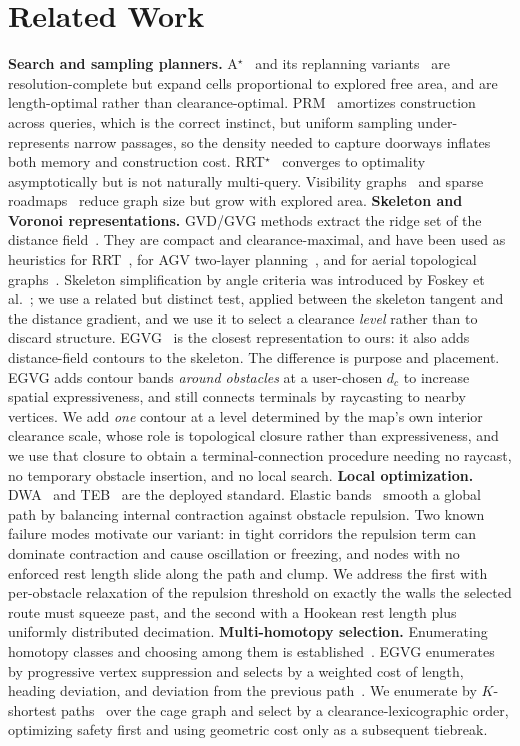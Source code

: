 \documentclass[conference]{IEEEtran}
\begin{document}
\section{Related Work}
\textbf{Search and sampling planners.} A$^\star$~\cite{hart1968} and its replanning variants~\cite{koenig2005} are resolution-complete but expand cells proportional to explored free area, and are length-optimal rather than clearance-optimal. PRM~\cite{kavraki1996} amortizes construction across queries, which is the correct instinct, but uniform sampling under-represents narrow passages, so the density needed to capture doorways inflates both memory and construction cost. RRT$^\star$~\cite{karaman2011,lavalle1998} converges to optimality asymptotically but is not naturally multi-query. Visibility graphs~\cite{yang2022far} and sparse roadmaps~\cite{dobson2014} reduce graph size but grow with explored area.
\textbf{Skeleton and Voronoi representations.} GVD/GVG methods extract the ridge set of the distance field~\cite{lau2013,hoff1999}. They are compact and clearance-maximal, and have been used as heuristics for RRT~\cite{chi2022}, for AGV two-layer planning~\cite{zhang2024agv}, and for aerial topological graphs~\cite{oleynikova2018}. Skeleton simplification by angle criteria was introduced by Foskey et al.~\cite{foskey2003}; we use a related but distinct test, applied between the skeleton tangent and the distance gradient, and we use it to select a clearance \emph{level} rather than to discard structure. EGVG~\cite{qi2025egvg} is the closest representation to ours: it also adds distance-field contours to the skeleton. The difference is purpose and placement. EGVG adds contour bands \emph{around obstacles} at a user-chosen $d_c$ to increase spatial expressiveness, and still connects terminals by raycasting to nearby vertices. We add \emph{one} contour at a level determined by the map's own interior clearance scale, whose role is topological closure rather than expressiveness, and we use that closure to obtain a terminal-connection procedure needing no raycast, no temporary obstacle insertion, and no local search.
\textbf{Local optimization.} DWA~\cite{fox1997} and TEB~\cite{rosmann2012} are the deployed standard. Elastic bands~\cite{quinlan1993} smooth a global path by balancing internal contraction against obstacle repulsion. Two known failure modes motivate our variant: in tight corridors the repulsion term can dominate contraction and cause oscillation or freezing, and nodes with no enforced rest length slide along the path and clump. We address the first with per-obstacle relaxation of the repulsion threshold on exactly the walls the selected route must squeeze past, and the second with a Hookean rest length plus uniformly distributed decimation.
\textbf{Multi-homotopy selection.} Enumerating homotopy classes and choosing among them is established~\cite{bhattacharya2012,qi2025egvg}. EGVG enumerates by progressive vertex suppression and selects by a weighted cost of length, heading deviation, and deviation from the previous path~\cite{qi2025egvg}. We enumerate by $K$-shortest paths~\cite{yen1971} over the cage graph and select by a clearance-lexicographic order, optimizing safety first and using geometric cost only as a subsequent tiebreak.
\end{document}
